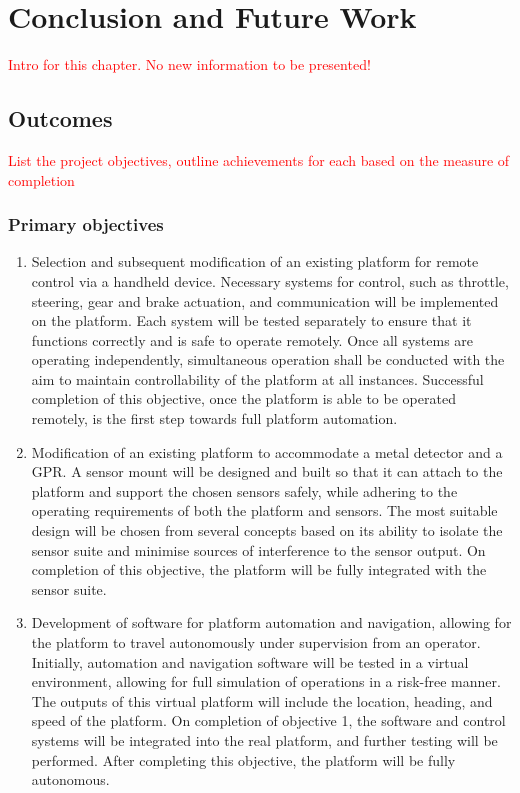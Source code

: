 \documentclass[main.tex]{subfiles}
\begin{document}
\chapter{Conclusion and Future Work}
\textcolor{red}{Intro for this chapter. No new information to be presented!}

\section{Outcomes}
\textcolor{red}{List the project objectives, outline achievements for each based on the measure of completion}

\subsection{Primary objectives}
\begin{enumerate}
\item Selection and subsequent modification of an existing platform for remote control via a handheld device. Necessary systems for control, such as throttle, steering, gear and brake actuation, and communication will be implemented on the platform. Each system will be tested separately to ensure that it functions correctly and is safe to operate remotely. Once all systems are operating independently, simultaneous operation shall be conducted with the aim to maintain controllability of the platform at all instances. Successful completion of this objective, once the platform is able to be operated remotely, is the first step towards full platform automation.  

\item Modification of an existing platform to accommodate a metal detector and a GPR. A sensor mount will be designed and built so that it can attach to the platform and support the chosen sensors safely, while adhering to the operating requirements of both the platform and sensors. The most suitable design will be chosen from several concepts based on its ability to isolate the sensor suite and minimise sources of interference to the sensor output. On completion of this objective, the platform will be fully integrated with the sensor suite.

\item Development of software for platform automation and navigation, allowing for the platform to travel autonomously under supervision from an operator. Initially, automation and navigation software will be tested in a virtual environment, allowing for full simulation of operations in a risk-free manner. The outputs of this virtual platform will include the location, heading, and speed of the platform. On completion of objective 1,  the software and control systems will be integrated into the real platform, and further testing will be performed. After completing this objective, the platform will be fully autonomous.


\end{enumerate}
\end{document}
